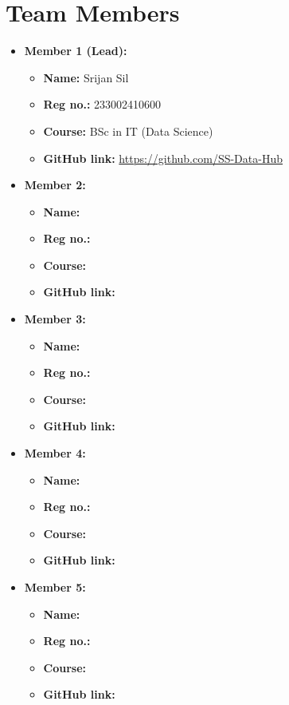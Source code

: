 \documentclass[a4paper,12pt]{article}
\begin{document}
\section*{Team Members}
\begin{itemize}
    \item \textbf{Member 1 (Lead):}
    \begin{itemize}
        \item \textbf{Name:} Srijan Sil
        \item \textbf{Reg no.:} 233002410600
        \item \textbf{Course:} BSc in IT (Data Science)
        \item \textbf{GitHub link:} \url{https://github.com/SS-Data-Hub}
    \end{itemize}
    \item \textbf{Member 2:}
    \begin{itemize}
        \item \textbf{Name:} 
        \item \textbf{Reg no.:} 
        \item \textbf{Course:} 
        \item \textbf{GitHub link:} \url{}
    \end{itemize}
    \item \textbf{Member 3:}
    \begin{itemize}
        \item \textbf{Name:} 
        \item \textbf{Reg no.:} 
        \item \textbf{Course:} 
        \item \textbf{GitHub link:} \url{}
    \end{itemize}
    \item \textbf{Member 4:}
    \begin{itemize}
        \item \textbf{Name:} 
        \item \textbf{Reg no.:} 
        \item \textbf{Course:} 
        \item \textbf{GitHub link:} \url{}
    \end{itemize}
    \item \textbf{Member 5:}
    \begin{itemize}
        \item \textbf{Name:} 
        \item \textbf{Reg no.:} 
        \item \textbf{Course:} 
        \item \textbf{GitHub link:} \url{}
    \end{itemize}
\end{itemize}
\end{document}
